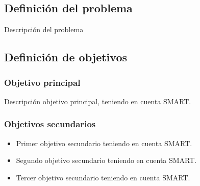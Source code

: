 \subsection{Definición del problema}
\label{subsection:problema}

Descripción del problema

\subsection{Definición de objetivos}
\label{subsection:objetivos}

\subsubsection{Objetivo principal}
Descripción objetivo principal, teniendo en cuenta SMART.

\subsubsection{Objetivos secundarios}
\begin{itemize}
  \item Primer objetivo secundario teniendo en cuenta SMART.
  \item Segundo objetivo secundario teniendo en cuenta SMART.
  \item Tercer objetivo secundario teniendo en cuenta SMART.
\end{itemize}

